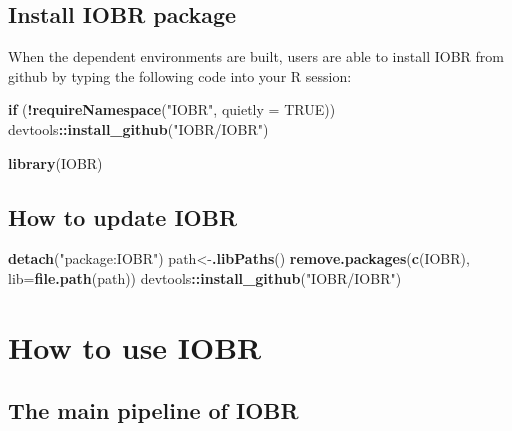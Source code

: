 \documentclass[
  12pt,
]{book}
\newenvironment{Shaded}{\begin{snugshade}}{\end{snugshade}}
\newcommand{\AttributeTok}[1]{\textcolor[rgb]{0.13,0.29,0.53}{#1}}
\newcommand{\ConstantTok}[1]{\textcolor[rgb]{0.56,0.35,0.01}{#1}}
\newcommand{\ControlFlowTok}[1]{\textcolor[rgb]{0.13,0.29,0.53}{\textbf{#1}}}
\newcommand{\FunctionTok}[1]{\textcolor[rgb]{0.13,0.29,0.53}{\textbf{#1}}}
\newcommand{\NormalTok}[1]{#1}
\newcommand{\OtherTok}[1]{\textcolor[rgb]{0.56,0.35,0.01}{#1}}
\newcommand{\SpecialCharTok}[1]{\textcolor[rgb]{0.81,0.36,0.00}{\textbf{#1}}}
\newcommand{\StringTok}[1]{\textcolor[rgb]{0.31,0.60,0.02}{#1}}
\begin{document}
\hypertarget{install-iobr-package}{%
\section{Install IOBR package}\label{install-iobr-package}}

When the dependent environments are built, users are able to install IOBR from github by typing the following code into your R session:

\begin{Shaded}
\begin{Highlighting}[]
\ControlFlowTok{if}\NormalTok{ (}\SpecialCharTok{!}\FunctionTok{requireNamespace}\NormalTok{(}\StringTok{"IOBR"}\NormalTok{, }\AttributeTok{quietly =} \ConstantTok{TRUE}\NormalTok{))  devtools}\SpecialCharTok{::}\FunctionTok{install\_github}\NormalTok{(}\StringTok{"IOBR/IOBR"}\NormalTok{)}

\FunctionTok{library}\NormalTok{(IOBR)}
\end{Highlighting}
\end{Shaded}

\hypertarget{how-to-update-iobr}{%
\section{How to update IOBR}\label{how-to-update-iobr}}

\begin{Shaded}
\begin{Highlighting}[]
\FunctionTok{detach}\NormalTok{(}\StringTok{"package:IOBR"}\NormalTok{)}
\NormalTok{path}\OtherTok{\textless{}{-}}\FunctionTok{.libPaths}\NormalTok{()}
\FunctionTok{remove.packages}\NormalTok{(}\FunctionTok{c}\NormalTok{(}\StringTok{\textquotesingle{}IOBR\textquotesingle{}}\NormalTok{), }\AttributeTok{lib=}\FunctionTok{file.path}\NormalTok{(path))}
\NormalTok{devtools}\SpecialCharTok{::}\FunctionTok{install\_github}\NormalTok{(}\StringTok{"IOBR/IOBR"}\NormalTok{)}
\end{Highlighting}
\end{Shaded}

\hypertarget{how-to-use-iobr}{%
\chapter{\texorpdfstring{\textbf{How to use IOBR}}{How to use IOBR}}\label{how-to-use-iobr}}

\hypertarget{the-main-pipeline-of-iobr}{%
\section{The main pipeline of IOBR}\label{the-main-pipeline-of-iobr}}
\end{document}
